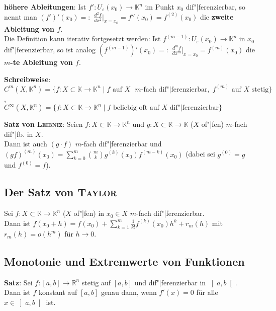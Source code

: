 \textbf{höhere Ableitungen}:
Ist $f': U_\varepsilon(x_0) \rightarrow \mathbb{K}^n$ im Punkt $x_0$
dif"|ferenzierbar, so nennt man
$(f')'(x_0) =:$ {\large $\frac{d^2 f}{dx^2}$}$\big|_{x=x_0} = f''(x_0) =
f^{(2)}(x_0)$ die \textbf{zweite Ableitung von $f$}. \\
Die Definition kann iterativ fortgesetzt werden:
Ist $f^{(m-1)}: U_\varepsilon(x_0) \rightarrow \mathbb{K}^n$ in $x_0$
dif"|ferenzierbar, so ist analog
$(f^{(m-1)})'(x_0) =:$ {\large $\frac{d^m f}{dx^m}$}$\big|_{x=x_0} =
f^{(m)}(x_0)$ die \textbf{$m$-te Ableitung von $f$}.

\textbf{Schreibweise}: \\
$C^m(X, \mathbb{K}^n) = \{f: X \subset \mathbb{K} \rightarrow \mathbb{K}^n
\;|\; f \text{ auf } X \text{ } m \text{-fach dif"|ferenzierbar},\;
f^{(m)} \text{ auf } X \text{ stetig}\}$, \\
$C^\infty(X, \mathbb{K}^n) = \{f: X \subset \mathbb{K} \rightarrow \mathbb{K}^n
\;|\; f \text{ beliebig oft auf } X \text{ dif"|ferenzierbar}\}$

\textbf{Satz von \textsc{Leibniz}}:
Seien $f: X \subset \mathbb{K} \rightarrow \mathbb{K}^n$ und
$g: X \subset \mathbb{K} \rightarrow \mathbb{K}$ ($X$ of"|fen)
$m$-fach dif"|fb. in $X$. \\
Dann ist auch $(g \cdot f)$ $m$-fach dif"|ferenzierbar und
$(gf)^{(m)}(x_0) = \sum_{k=0}^m \binom{m}{k} g^{(k)}(x_0) f^{(m-k)}(x_0)$
(dabei sei $g^{(0)} = g$ und $f^{(0)} = f$).

\subsection{%
    Der Satz von \textsc{Taylor}%
}

Sei $f: X \subset \mathbb{K} \rightarrow \mathbb{K}^n$ ($X$ of"|fen)
in $x_0 \in X$ $m$-fach dif"|ferenzierbar. \\
Dann ist $f(x_0 + h) = f(x_0) + \sum_{k=1}^m \frac{1}{k!} f^{(k)}(x_0) h^k +
r_m(h)$ mit $r_m(h) = o(h^m)$ für $h \to 0$.

\addtocounter{subsection}{1}
\subsection{%
    Monotonie und Extremwerte von Funktionen%
}

\textbf{Satz}:
Sei $f: [a,b] \rightarrow \mathbb{R}^n$ stetig auf $[a,b]$ und dif"|ferenzierbar
in $\left]a,b\right[$. \\
Dann ist $f$ konstant auf $[a,b]$ genau dann, wenn $f'(x) = 0$ für alle
$x \in \left]a,b\right[$ ist.

